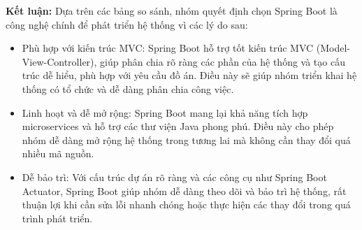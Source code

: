 \begin{enumerate}[(a)]
            \textbf{Kết luận: } Dựa trên các bảng so sánh, nhóm quyết định chọn Spring Boot là công nghệ chính để phát triển hệ thống vì các lý do sau:

            \begin{itemize}
                \item Phù hợp với kiến trúc MVC: Spring Boot hỗ trợ tốt kiến trúc MVC (Model-View-Controller), giúp phân chia rõ ràng các phần của hệ thống và tạo cấu trúc dễ hiểu, phù hợp với yêu cầu đồ án. Điều này sẽ giúp nhóm triển khai hệ thống có tổ chức và dễ dàng phân chia công việc.
                \item Linh hoạt và dễ mở rộng: Spring Boot mang lại khả năng tích hợp microservices và hỗ trợ các thư viện Java phong phú. Điều này cho phép nhóm dễ dàng mở rộng hệ thống trong tương lai mà không cần thay đổi quá nhiều mã nguồn.
                \item Dễ bảo trì: Với cấu trúc dự án rõ ràng và các công cụ như Spring Boot Actuator, Spring Boot giúp nhóm dễ dàng theo dõi và bảo trì hệ thống, rất thuận lợi khi cần sửa lỗi nhanh chóng hoặc thực hiện các thay đổi trong quá trình phát triển.
            \end{itemize}
            
    \end{enumerate}

